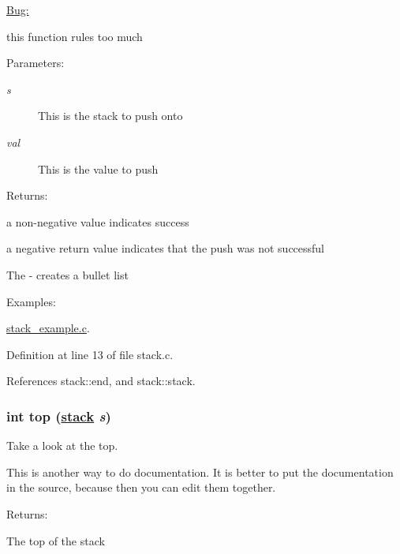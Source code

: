 \begin{Desc}
\item[\hyperlink{bug__bug000001}{Bug: }]\par
this function rules too much\end{Desc}
 \begin{Desc}
\item[Parameters: ]\par
\begin{description}
\item[{\em 
s}]This is the stack to push onto \item[{\em 
val}]This is the value to push\end{description}
\end{Desc}
\begin{Desc}
\item[Returns: ]\par
\begin{CompactItemize}
\item 
a non-negative value indicates success\item 
a negative return value indicates that the push was not successful\item 
The - creates a bullet list \end{CompactItemize}
\end{Desc}
\begin{Desc}
\item[Examples: ]\par
\hyperlink{stack__example_8c-example}{stack\_\-example.c}.\end{Desc}


Definition at line 13 of file stack.c.

References stack::end, and stack::stack.\hypertarget{group__stack_a2}{
\subsubsection[top]{\setlength{\rightskip}{0pt plus 5cm}int top (\hyperlink{structstack}{stack} {\em s})}}
\label{group__stack_a2}


Take a look at the top.

This is another way to do documentation. It is better to put the documentation in the source, because then you can edit them together.

\begin{Desc}
\item[Returns: ]\par
The top of the stack \end{Desc}
